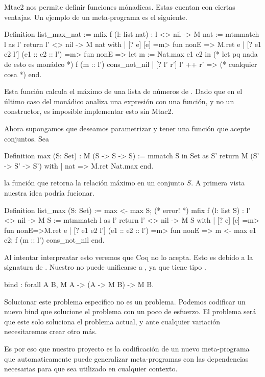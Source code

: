 Mtac2 nos permite definir funciones mónadicas. Estas cuentan con ciertas ventajas. Un ejemplo de un meta-programa es el siguiente.

\begin{coq}
Definition list_max_nat :=
  mfix f (l: list nat) : l <> nil -> M nat :=
    mtmmatch l as l' return l' <> nil -> M nat with
    | [? e] [e] =m> fun nonE => M.ret e
    | [? e1 e2 l'] (e1 :: e2 :: l') =m> fun nonE =>
      let m := Nat.max e1 e2 in (* let pq nada de esto es monádco *)
      f (m :: l') cons_not_nil
    | [? l' r'] l' ++ r' => (* cualquier cosa *) 
    end.
\end{coq}

Esta función calcula el máximo de una lista de números de \nat. Dado que en el último caso del  monádico analiza una expresión
con una función, y no un constructor, es imposible implementar esto sin Mtac2.

Ahora supongamos que deseamos parametrizar \nat y tener una función que acepte conjuntos. Sea
\begin{coq}
Definition max (S: Set) : M (S -> S -> S) :=
  mmatch S in Set as S' return M (S' -> S' -> S') with
  | nat => M.ret Nat.max
  end.
\end{coq}

la función que retorna la relación máximo en un conjunto $S$. A primera vista nuestra idea podría fucionar.

\begin{coq}
Definition list_max (S: Set)  :=
  max <- max S; (* error! *)
  mfix f (l: list S) : l' <> nil -> M S :=
    mtmmatch l as l' return l' <> nil -> M S with
    | [? e] [e] =m> fun nonE=>M.ret e
    | [? e1 e2 l'] (e1 :: e2 :: l') =m> fun nonE =>
      m <- max e1 e2;
      f (m :: l') cons_not_nil
    end.
\end{coq}

Al intentar interpreatar esto veremos que Coq no lo acepta. Esto es debido a la signatura de . Nuestro  no puede
unificarse a , ya que tiene tipo .

\begin{coq}
bind : forall A B, M A -> (A -> M B) -> M B.
\end{coq}

Solucionar este problema específico no es un problema. Podemos codificar un nuevo bind que solucione el problema con un poco de esfuerzo.
El problema será que este solo soluciona el problema actual, y ante cualquier variación necesitaremos crear otro  más.

Es por eso que nuestro proyecto es la codificación de un nuevo meta-programa  que automaticamente puede generalizar meta-programas
con las dependencias necesarias para que sea utilizado en cualquier contexto.